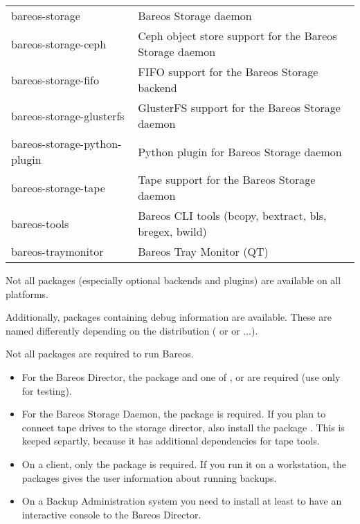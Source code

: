 \begin{center}
\begin{tabular}{ | l | l | }
bareos-storage & Bareos Storage daemon \\
bareos-storage-ceph & Ceph object store support for the Bareos Storage daemon \\
bareos-storage-fifo & FIFO support for the Bareos Storage backend \\
bareos-storage-glusterfs & GlusterFS support for the Bareos Storage daemon \\
bareos-storage-python-plugin & Python plugin for Bareos Storage daemon \\
bareos-storage-tape & Tape support for the Bareos Storage daemon \\
bareos-tools & Bareos CLI tools (bcopy, bextract, bls, bregex, bwild) \\
bareos-traymonitor & Bareos Tray Monitor (QT) \\
\hline
\end{tabular}
\end{center}

Not all packages (especially optional backends and plugins) are available on all platforms.

Additionally, packages containing debug information are available.
These are named differently depending on the distribution ( or  or  $\ldots$).

Not all packages are required to run Bareos.

\begin{itemize}
    \item For the Bareos Director, the package  and one of ,  or  are required (use  only for testing).

    \item For the Bareos Storage Daemon, the package  is required. If you plan to connect tape drives to the storage director, also install the package . This is keeped separtly, because it has additional dependencies  for tape tools.

    \item On a client, only the package  is required. If you run it on a workstation, the packages  gives the user information about running backups.

    \item On a Backup Administration system you need to install at least  to have an interactive console to the Bareos Director.

\end{itemize}



